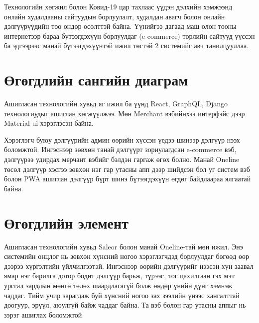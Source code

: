 Технологийн хөгжил болон Ковид-19 цар тахлаас үүдэн дэлхийн хэмжээнд онлайн худалдааны сайтуудын борлуулалт, худалдан авагч болон онлайн дэлгүүрүүдийн тоо өндөр өсөлттэй байна. Үүнийгээ дагаад маш олон тооны интернетээр бараа бүтээгдэхүүн борлуулдаг (e-commerce) төрлийн сайтууд үүссэн ба эдгээрээс манай бүтээгдэхүүнтэй ижил төстэй 2 системийг авч танилцууллаа.
    
    
\section{Өгөгдлийн сангийн диаграм}
Ашигласан технологийн хувьд яг ижил ба үүнд React, GraphQL, Django технологиудыг ашиглан хөгжүүлжээ. Мөн Merchant вэбийнхээ интерфэйс дээр Material-ui хэрэглэсэн байна. 

Хэрэглэгч буюу дэлгүүрийн админ өөрийн хүссэн үедээ шинээр дэлгүүр нээх боломжтой. Ингэснээр зөвхөн танай дэлгүүрт зориулагдсан e-commerce вэб, дэлгүүрээ удирдах мерчант вэбийг бэлдэн гаргаж өгөх болно. Манай Oneline төсөл дэлгүүр хэсгээ зөвхөн нэг гар утасны апп дээр шийдсэн бол уг систем вэб болон PWA ашиглан дэлгүүр бүрт шинэ бүтээгдэхүүн өгдөг байдлаараа ялгаатай байна. 


\section{Өгөгдлийн элемент}
Ашигласан технологийн хувьд Saleor болон манай Oneline-тай мөн ижил. Энэ системийн онцлог нь зөвхөн хүнсний ногоо хэрэглэгчдэд борлуулдаг бөгөөд өөр дээрээ хүргэлтийн үйлчилгээтэй. Ингэснээр өөрийн дэлгүүрийг нээсэн хүн заавал ямар нэг барилга дотор бодит дэлгүүр барьж, түрээс, тог цахилгаан гэх мэт урсгал зардлын мөнгө төлөх шаардлагагүй болж өндөр үнийн дүнг хэмнэж чаддаг. Тийм учир зарагдаж буй хүнсний ногоо зах зээлийн үнээс хангалттай доогуур, эрүүл, аюулгүй байж чаддаг байна. Та вэб болон гар утасны аппыг нь зэрэг ашиглах боломжтой
